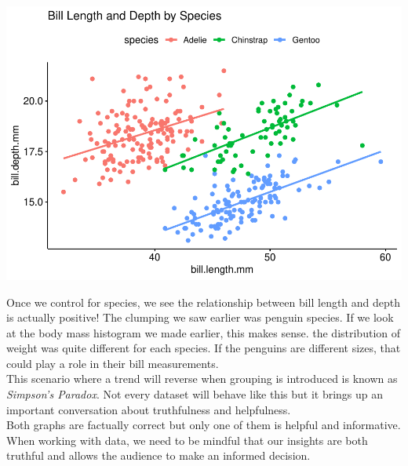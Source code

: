 \documentclass[
]{article}
\begin{document}
\includegraphics{Econ-Club-Example_files/figure-latex/Simpsons paradox 2-1.pdf}

Once we control for species, we see the relationship between bill length
and depth is actually positive! The clumping we saw earlier was penguin
species. If we look at the body mass histogram we made earlier, this
makes sense. the distribution of weight was quite different for each
species. If the penguins are different sizes, that could play a role in
their bill measurements.\\
This scenario where a trend will reverse when grouping is introduced is
known as \emph{Simpson's Paradox}. Not every dataset will behave like
this but it brings up an important conversation about truthfulness and
helpfulness.\\
Both graphs are factually correct but only one of them is helpful and
informative. When working with data, we need to be mindful that our
insights are both truthful and allows the audience to make an informed
decision.
\end{document}
